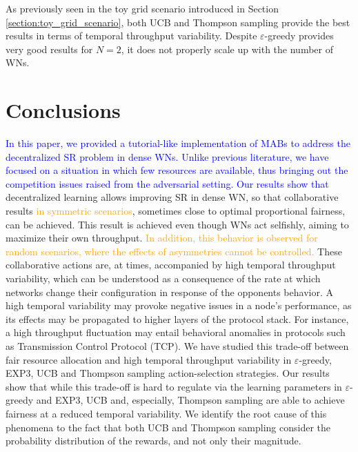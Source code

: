 \documentclass[preprint,12pt]{elsarticle}
\newcommand{\francesc}[1]{\textcolor{blue}{#1}}
\newcommand{\francesco}[1]{\textcolor{orange}{#1}}
\begin{document}
As previously seen in the toy grid scenario introduced in Section \ref{section:toy_grid_scenario}, both UCB and Thompson sampling provide the best results in terms of temporal throughput variability. Despite $\varepsilon$-greedy provides very good results for $N=2$, it does not properly scale up with the number of WNs.   

\section{Conclusions }
\label{section:conclusions}
\francesc{In this paper, we provided a tutorial-like implementation of MABs to address the decentralized SR problem in dense WNs. Unlike previous literature, we have focused on a situation in which few resources are available, thus bringing out the competition issues raised from the adversarial setting. Our results show that} decentralized learning allows improving SR in dense WN, so that collaborative results \francesco{in symmetric scenarios}, sometimes close to optimal proportional fairness, can be achieved. This result is achieved even though WNs act selfishly, aiming to maximize their own throughput. \francesco{In addition, this behavior is observed for random scenarios, where the effects of asymmetries cannot be controlled.} %
These collaborative actions are, at times, accompanied by high temporal throughput variability, which can be understood as a consequence of the  rate at which networks change their configuration in response of the opponents behavior. A high temporal variability may provoke negative issues in a node's performance, as its effects may be propagated to higher layers of the protocol stack. For instance, a high throughput fluctuation may entail behavioral anomalies in protocols such as Transmission Control Protocol (TCP). %
We have studied this trade-off between fair resource allocation and high temporal throughput variability in $\varepsilon$-greedy, EXP3, UCB and Thompson sampling action-selection strategies. Our results show that while this trade-off is hard to regulate via the learning parameters in $\varepsilon$-greedy and EXP3, UCB  and, especially, Thompson sampling are able to achieve fairness at a reduced temporal variability. We identify the root cause of this phenomena to the fact that both UCB and Thompson sampling consider the probability distribution of the rewards, and not only their magnitude.
\end{document}

